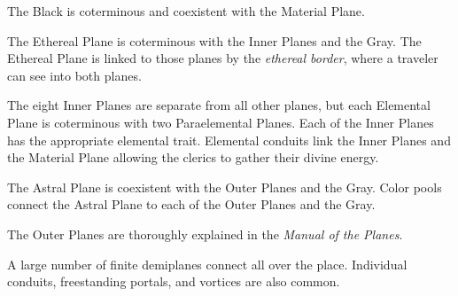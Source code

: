 The Black is coterminous and coexistent with the Material Plane.


The Ethereal Plane is coterminous with the Inner Planes and the Gray. The Ethereal Plane is linked to those planes by the \emph{ethereal border}, where a traveler can see into both planes.

The eight Inner Planes are separate from all other planes, but each Elemental Plane is coterminous with two Paraelemental Planes. Each of the Inner Planes has the appropriate elemental trait. Elemental conduits link the Inner Planes and the Material Plane allowing the clerics to gather their divine energy.

The Astral Plane is coexistent with the Outer Planes and the Gray. Color pools connect the Astral Plane to each of the Outer Planes and the Gray.



The Outer Planes are thoroughly explained in the \emph{Manual of the Planes}.

A large number of finite demiplanes connect all over the place. Individual conduits, freestanding portals, and vortices are also common.
